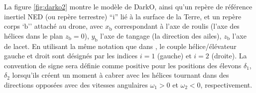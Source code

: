 La figure \ref{fig:darko2} montre le modèle de DarkO, ainsi qu'un repère de référence inertiel NED (ou repère terrestre) ``$\text{i}$'' lié à la surface de la Terre, et un repère corps `$\text{b}$'' attaché au drone, avec $x_{\text{b}}$ correspondant à l'axe de roulis (l'axe des hélices dans le plan $z_{\text{b}} =0$), $y_{\text{b}}$ l'axe de tangage (la direction des ailes), $z_{\text{b}}$ l'axe de lacet. En utilisant la même notation que dans \cite{lustosaHal-03035938}, le couple hélice/élévateur gauche et droit sont désignés par les indices $i=1$ (gauche) et $i=2$ (droite). La convention de signe sera définie comme positive pour les positions des élevons $\delta_{1}$, $\delta_{2}$ lorsqu'ils créent un moment à cabrer avec les hélices tournant dans des directions opposées avec des vitesses angulaires $\omega_{1} > 0$ et $\omega_{2} < 0$, respectivement.

